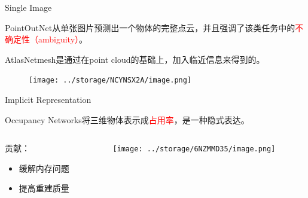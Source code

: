 \documentclass[dark]{sintefbeamer}
\begin{document}
\begin{frame}[t, fragile]{Single Image}
  
  PointOutNet\cite{fanPointSetGeneration2016}从单张图片预测出一个物体的完整点云，并且强调了该类任务中的\textcolor{red}{不确定性（ambiguity）}。

  AtlasNet\cite{groueixAtlasNetPapierMAch2018a}mesh是通过在point cloud的基础上，加入临近信息来得到的。
  
  \begin{figure}
    \texttt{[image: ../storage/NCYNSX2A/image.png]}
  \end{figure}
 
\end{frame}

\begin{frame}[fragile]{Implicit Representation}

  Occupancy Networks\cite{meschederOccupancyNetworksLearning2019}将三维物体表示成\textcolor{red}{占用率}，是一种隐式表达。

  \begin{columns}
    \begin{column}{0.5\textwidth}
      贡献：
      \begin{itemize}
        \item 缓解内存问题
        \item 提高重建质量
      \end{itemize}
  
    \end{column}
    \begin{column}{0.5\textwidth}
      \texttt{[image: ../storage/6NZMMD35/image.png]}
    \end{column}
  \end{columns}
  
\end{frame}
\end{document}
